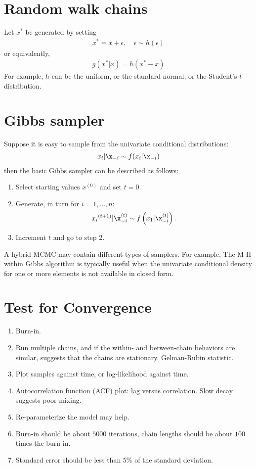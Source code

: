 \documentclass{article}
\newcommand{\dual}[2]{{#1}^{(#2)}} %
\begin{document}
\section{Random walk chains}
Let $x^*$ be generated by setting
\begin{align}
x^* = x + \epsilon,\quad \epsilon \sim h(\epsilon)
\end{align}
or equivalently,
\begin{align}
g(x^*|x) = h(x^* - x)
\end{align}
For example, $h$ can be the uniform, or the standard normal, or the Student's $t$ distribution.


\section{Gibbs sampler}
Suppose it is easy to sample from the univariate conditional distributions:
\begin{align}
x_i | \x_{-i} \sim f(x_i | \x_{-i})
\end{align}
then the basic Gibbs sampler can be described as follows:
\begin{enumerate}
\item Select starting values $\dual{x}{0}$ and set $t=0$.
\item Generate, in turn for $i = 1, \dots, n$:
\begin{align}
\dual{x_i}{t+1} | \x_{-i}^{(t)} \sim f\left(x_1 | \x_{-i}^{(t)}\right).
\end{align}
\item Increment $t$ and go to step 2.
\end{enumerate}
A hybrid MCMC may contain different types of samplers. For example, The M-H within Gibbs algorithm is typically useful when the univariate conditional density for one or more elements is not available in closed form.

\section{Test for Convergence}
\begin{enumerate}
\item Burn-in.
\item Run multiple chains, and if the within- and between-chain behaviors are similar, suggests that the chains are stationary. Gelman-Rubin statistic.
\item Plot samples against time, or log-likelihood against time.
\item Autocorrelation function (ACF) plot: lag versus correlation. Slow decay suggests poor mixing.
\item Re-parameterize the model may help.
\item Burn-in should be about $5000$ iterations, chain lengths should be about $100$ times the burn-in.
\item Standard error should be less than $5\%$ of the standard deviation.
\end{enumerate}
\end{document}
